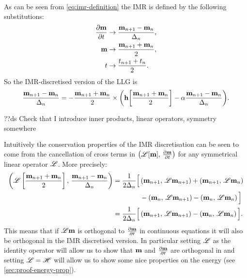 As can be seen from \cref{eq:imr-definition} the IMR is defined by the following substitutions:
\begin{equation}
\begin{aligned}
  \label{eq:55}
  \frac{\partial \mathbf{m}}{\partial t} &\rightarrow \frac{\mathbf{m}_{n+1} - \mathbf{m}_n}{\Delta_{n}}, \\
  \mathbf{m} &\rightarrow \frac{\mathbf{m}_{n+1} + \mathbf{m}_n}{2}, \\
  t &\rightarrow \frac{t_{n+1} + t_n}{2}.
\end{aligned}
\end{equation}
So the IMR-discretised version of the LLG is
\begin{equation}
  \frac{\mathbf{m}_{n+1} - \mathbf{m}_n}{\Delta_{n}} = - \frac{\mathbf{m}_{n+1} + \mathbf{m}_n}{2} \times
  {\left( \mathbf{h}{\left[ \frac{\mathbf{m}_{n+1} + \mathbf{m}_n}{2} \right]} - \alpha\frac{\mathbf{m}_{n+1} - \mathbf{m}_n}{\Delta_{n}} \right)}.
  \label{eqn:disc-llg}
\end{equation}

??ds Check that I introduce inner products, linear operators, symmetry somewhere

Intuitively the conservation properties of the IMR discretisation can be seen to come from the cancellation of cross terms in $\left(\mathscr{L}[\mathbf{m}],\, \frac{\partial \mathbf{m}}{\partial t} \right)$ for any symmetrical linear operator $\mathscr{L}$.
More precisely:
\begin{equation}
  \begin{aligned}
    \label{eqn:imr-linop}
    \left(\mathscr{L} \left[ \frac{\mathbf{m}_{n+1} + \mathbf{m}_n}{2} \right],\,  \frac{\mathbf{m}_{n+1} - \mathbf{m}_n}{\Delta_{n}}  \right)
    &= \frac{1}{2\Delta_{n}} \Big[
    \left(\mathbf{m}_{n+1},\, \mathscr{L} \mathbf{m}_{n+1} \right) + \left(\mathbf{m}_{n+1},\, \mathscr{L} \mathbf{m}_{n} \right) \\
    & \qquad\qquad - \left(\mathbf{m}_{n},\, \mathscr{L} \mathbf{m}_{n+1} \right) - \left(\mathbf{m}_{n},\, \mathscr{L} \mathbf{m}_{n} \right)
    \Big] \\
    &= \frac{1}{2\Delta_{n}} \Big[
    \left(\mathbf{m}_{n+1},\, \mathscr{L} \mathbf{m}_{n+1} \right)
    - \left(\mathbf{m}_{n},\, \mathscr{L} \mathbf{m}_{n} \right)
    \Big].
  \end{aligned}
\end{equation}
This means that if $\mathscr{L} \mathbf{m}$ is orthogonal to $\frac{\partial \mathbf{m}}{\partial t}$ in continuous equations it will also be orthogonal in the IMR discretised version.
In particular setting $\mathscr{L}$ as the identity operator will allow us to show that $\mathbf{m}$ and $\frac{\partial \mathbf{m}}{\partial t}$ are orthogonal in  and setting $\mathscr{L} = \mathscr{H}$ will allow us to show some nice properties on the energy (see \cref{sec:proof-energy-prop}).

